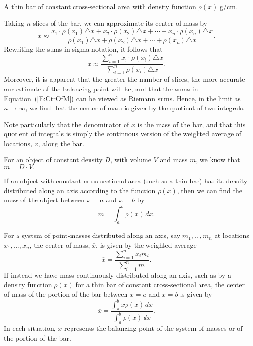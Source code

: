 \begin{marginfigure} %
\caption{A thin bar of constant cross-sectional area with density function $\rho(x)$ g/cm.} \label{F:6.3.Bar2}
\end{marginfigure}

Taking $n$ slices of the bar, we can approximate its center of mass by 
$$\overline{x} \approx \frac{x_1 \cdot \rho(x_1) \triangle x + x_2 \cdot \rho(x_2) \triangle x  + \cdots + x_n \cdot \rho(x_n) \triangle x }{\rho(x_1) \triangle x + \rho(x_2) \triangle x + \cdots + \rho(x_n) \triangle x}.$$
Rewriting the sums in sigma notation, it follows that
\begin{equation} \label{E:CtrOfM}
\overline{x} \approx \frac{\sum_{i = 1}^{n} x_i \cdot \rho(x_i) \triangle x}{\sum_{i = 1}^{n} \rho(x_i) \triangle x}.
\end{equation}
Moreover, it is apparent that the greater the number of slices, the more accurate our estimate of the balancing point will be, and that the sums in Equation~(\ref{E:CtrOfM}) can be viewed as Riemann sums.  Hence, in the limit as $n \to \infty$, we find that the center of mass is given by the quotient of two integrals.


Note particularly that the denominator of $\overline{x}$ is the mass of the bar, and that this quotient of integrals is simply the continuous version of the weighted average of locations, $x$, along the bar.



\begin{summary}
  \item For an object of constant density $D$, with volume $V$ and mass $m$, we know that $m = D \cdot V.$
  \item If an object with constant cross-sectional area (such as a thin bar) has its density distributed along an axis according to the function $\rho(x)$, then we can find the mass of the object between $x = a$ and $x = b$ by
  $$m = \int_a^b \rho(x) \, dx.$$
  \item For a system of point-masses distributed along an axis, say $m_1, \ldots, m_n$ at locations $x_1, \ldots, x_n$, the center of mass, $\overline{x}$, is given by the weighted average
  $$\overline{x} = \frac{\sum_{i=1}^n x_i m_i}{\sum_{i=1}^n m_i}.$$
  If instead we have mass continuously distributed along an axis, such as by a density function $\rho(x)$ for a thin bar of constant cross-sectional area, the center of mass of the portion of the bar between $x = a$ and $x = b$ is given by
  $$\overline{x} = \frac{\int_a^b x \rho(x) \, dx}{\int_a^b \rho(x) \, dx}.$$
  In each situation, $\overline{x}$ represents the balancing point of the system of masses or of the portion of the bar.
\end{summary}

\clearpage

 

\cleardoublepage